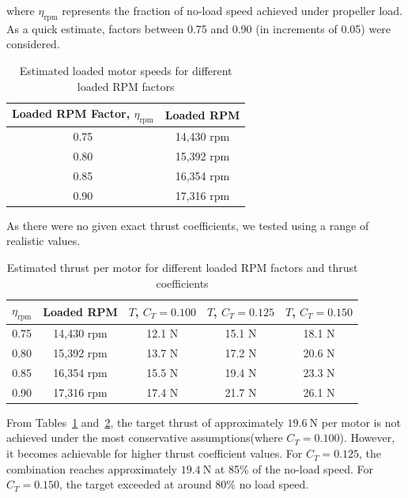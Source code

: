 \documentclass{report_template_oxford}
\begin{document}
where \(\eta_{\text{rpm}}\) represents the fraction of no-load speed achieved under propeller load. As a quick estimate, factors between 0.75 and 0.90 (in increments of 0.05) were considered.

\begin{table}[htbp]
\centering
\caption{Estimated loaded motor speeds for different loaded RPM factors}
\label{tab:loaded_rpm_factors}
\begin{tabular}{|c|c|}
\hline
\textbf{Loaded RPM Factor, \(\eta_{\text{rpm}}\)} & \textbf{Loaded RPM} \\
\hline
0.75 & 14,430 rpm \\
0.80 & 15,392 rpm \\
0.85 & 16,354 rpm \\
0.90 & 17,316 rpm \\
\hline
\end{tabular}
\end{table}

As there were no given exact thrust coefficients, we tested using a range of realistic values.

\begin{table}[htbp]
\centering
\caption{Estimated thrust per motor for different loaded RPM factors and thrust coefficients}
\label{tab:motor_prop_validity_check}
\begin{tabular}{|c|c|c|c|c|}
\hline
\textbf{\(\eta_{\text{rpm}}\)} & \textbf{Loaded RPM} & \textbf{\(T\), \(C_T=0.100\)} & \textbf{\(T\), \(C_T=0.125\)} & \textbf{\(T\), \(C_T=0.150\)} \\
\hline
0.75 & 14,430 rpm & 12.1 N & 15.1 N & 18.1 N \\
0.80 & 15,392 rpm & 13.7 N & 17.2 N & 20.6 N \\
0.85 & 16,354 rpm & 15.5 N & 19.4 N & 23.3 N \\
0.90 & 17,316 rpm & 17.4 N & 21.7 N & 26.1 N \\
\hline
\end{tabular}
\end{table}

From Tables~\ref{tab:loaded_rpm_factors} and~\ref{tab:motor_prop_validity_check}, the target thrust of approximately \(19.6~\text{N}\) per motor is not achieved under the most conservative assumptions(where \(C_T = 0.100\)). However, it becomes achievable for higher thrust coefficient values. For \(C_T = 0.125\), the combination reaches approximately \(19.4~\text{N}\) at 85\% of the no-load speed. For \(C_T = 0.150\), the target exceeded at around 80\% no load speed.
\end{document}
